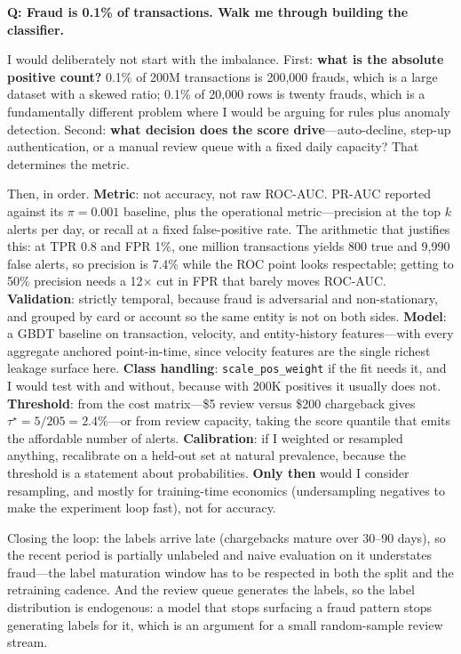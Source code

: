 \begin{interviewq}
\textbf{Q: Fraud is 0.1\% of transactions. Walk me through building the classifier.}

 \quad {} \quad \badgefreq{\freqhigh}

\stronganswer

I would deliberately not start with the imbalance. First: \textbf{what is the absolute positive count?} 0.1\% of 200M transactions is 200{,}000 frauds, which is a large dataset with a skewed ratio; 0.1\% of 20{,}000 rows is twenty frauds, which is a fundamentally different problem where I would be arguing for rules plus anomaly detection. Second: \textbf{what decision does the score drive}---auto-decline, step-up authentication, or a manual review queue with a fixed daily capacity? That determines the metric.

Then, in order. \textbf{Metric}: not accuracy, not raw ROC-AUC. PR-AUC reported against its $\pi = 0.001$ baseline, plus the operational metric---precision at the top $k$ alerts per day, or recall at a fixed false-positive rate. The arithmetic that justifies this: at TPR 0.8 and FPR 1\%, one million transactions yields 800 true and 9{,}990 false alerts, so precision is 7.4\% while the ROC point looks respectable; getting to 50\% precision needs a 12$\times$ cut in FPR that barely moves ROC-AUC. \textbf{Validation}: strictly temporal, because fraud is adversarial and non-stationary, and grouped by card or account so the same entity is not on both sides. \textbf{Model}: a GBDT baseline on transaction, velocity, and entity-history features---with every aggregate anchored point-in-time, since velocity features are the single richest leakage surface here. \textbf{Class handling}: \texttt{scale\_pos\_weight} if the fit needs it, and I would test with and without, because with 200K positives it usually does not. \textbf{Threshold}: from the cost matrix---\$5 review versus \$200 chargeback gives $\tau^\star = 5/205 = 2.4\%$---or from review capacity, taking the score quantile that emits the affordable number of alerts. \textbf{Calibration}: if I weighted or resampled anything, recalibrate on a held-out set at natural prevalence, because the threshold is a statement about probabilities. \textbf{Only then} would I consider resampling, and mostly for training-time economics (undersampling negatives to make the experiment loop fast), not for accuracy.

Closing the loop: the labels arrive late (chargebacks mature over 30--90 days), so the recent period is partially unlabeled and naive evaluation on it understates fraud---the label maturation window has to be respected in both the split and the retraining cadence. And the review queue generates the labels, so the label distribution is endogenous: a model that stops surfacing a fraud pattern stops generating labels for it, which is an argument for a small random-sample review stream.


\end{interviewq}
